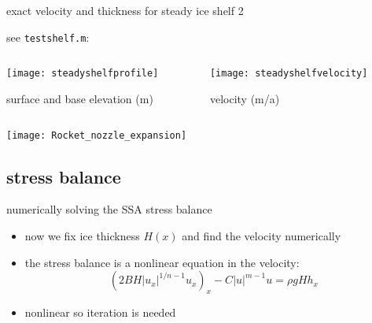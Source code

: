 \begin{frame}{exact velocity and thickness for steady ice shelf 2}

\small see \texttt{testshelf.m}:
\bigskip

\begin{columns}
\begin{column}{0.5\textwidth}
  \texttt{[image: steadyshelfprofile]}

\begin{center}
surface and base elevation (m)
\end{center}
\end{column}
\begin{column}{0.5\textwidth}
  \texttt{[image: steadyshelfvelocity]}

\begin{center}
velocity (m/a)
\end{center}
\end{column}
\end{columns}

\vspace{10mm}
\texttt{[image: Rocket\_nozzle\_expansion]}
\end{frame}


\subsection{stress balance}

\begin{frame}{numerically solving the SSA stress balance}

\begin{itemize}
\item now we fix ice thickness $H(x)$ and find the velocity numerically
\item the stress balance is a nonlinear equation in the velocity:
  $$\left(2 B H |u_x|^{1/n - 1} u_x\right)_x - C|u|^{m-1}u = \rho g H h_x$$
\item nonlinear so \alert{iteration is needed}
\end{itemize}
\end{frame}


